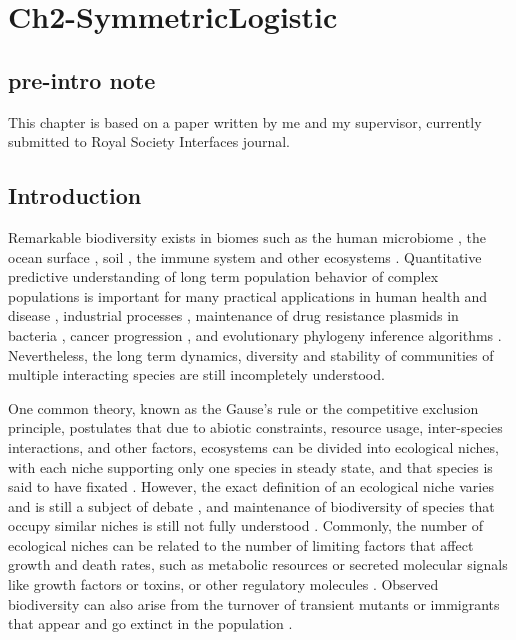 \chapter{Ch2-SymmetricLogistic}



\section*{pre-intro note}
This chapter is based on a paper written by me and my supervisor, currently submitted to Royal Society Interfaces journal. 

\section{Introduction}

Remarkable biodiversity exists in biomes such as the human microbiome \cite{Korem2015,Coburn2015,Palmer2001}, the ocean surface \cite{Hutchinson1961,Cordero2016}, soil \cite{Friedman2016}, the immune system \cite{Weinstein2009,Desponds2015,Stirk2010} and other ecosystems \cite{Tilman1996,Naeem2001}. 
Quantitative predictive understanding of long term population behavior of complex populations is important for many practical applications in human health and disease \cite{Coburn2015,Palmer2001,Kinross2011}, industrial processes \cite{Wolfe2014}, maintenance of drug resistance plasmids in bacteria \cite{Gooding-townsend2015}, cancer progression \cite{Ashcroft2015}, and evolutionary phylogeny inference algorithms \cite{Rice2004,Blythe2007}. 
Nevertheless, the long term dynamics, diversity and stability of communities of multiple interacting species are still incompletely understood.

One common theory, known as the Gause's rule or the competitive exclusion principle, postulates that due to abiotic constraints, resource usage, inter-species interactions, and other factors, ecosystems can be divided into ecological niches, with each niche supporting only one species in steady state, and that species is said to have fixated \cite{Hardin1960,Mayfield2010,Kimura1968,Nadell2013}. 
However, the exact definition of an ecological niche varies and is still a subject of debate \cite{Leibold1995,Hutchinson1961,Abrams1980,Chesson2000,Adler2010,Capitan2017,Fisher2014}, and maintenance of biodiversity of species that occupy similar niches is still not fully understood \cite{May1999,Pennisi2005,Posfai2017}. 
Commonly, the number of ecological niches can be related to the number of limiting factors that affect growth and death rates, such as metabolic resources or secreted molecular signals like growth factors or toxins, or other regulatory molecules \cite{Armstrong1976,McGehee1977a,Armstrong1980,Posfai2017}. 
Observed biodiversity can also arise from the turnover of transient mutants or immigrants that appear and go extinct in the population \cite{Hubbell2001,Desai2007,Carroll2015}.

